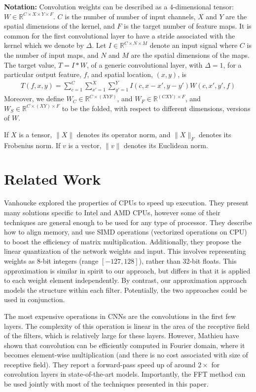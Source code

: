 \noindent \textbf{Notation:} Convolution weights can be described as
 a $4$-dimensional tensor: $W \in \mathbb{R}^{C \times X \times Y
   \times F}$. $C$ is the number of number of input channels, $X$ and
 $Y$ are the spatial dimensions of the kernel, and $F$ is the target
 number of feature maps. 
 It is common for the first convolutional layer to have a stride associated with the kernel which we denote by $\Delta$.  Let $I \in \mathbb{R}^{C \times N \times M}$
 denote an input signal where $C$ is the number of input maps, and $N$
 and $M$ are the spatial dimensions of the maps.  The target value, $T
 = I \ast W$, of a generic convolutional layer, with $\Delta = 1$, for a particular output
 feature, $f$, and spatial location, $(x, y)$, is
\begin{align*}
\label{convlayereq}
T(f,x,y) = \sum_{c=1}^C \sum_{x'=1}^{X} \sum_{y'=1}^{Y} I(c,x-x',y-y') W(c,x',y',f)
\end{align*}
Moreover, we define $W_C \in \mathbb{R}^{C \times (XYF)}$, and $W_F \in \mathbb{R}^{(CXY) \times F}$, 
and $W_S \in \mathbb{R}^{C \times (XY) \times F}$ to be the folded, with respect to different dimensions, versions of $W$.

If $X$ is a tensor, $\|X \|$ denotes its operator norm, and $\|X \|_F$ denotes its Frobenius norm.
If $v$ is a vector, $\|v \|$ denotes its Euclidean norm.

\section{Related Work}
\label{relwork}

Vanhoucke \etal \cite{vanhoucke2011improving} explored the
properties of CPUs to speed up execution.  They present many solutions
specific to Intel and AMD CPUs, however some of their techniques are
general enough to be used for any type of processor.  They describe
how to align memory, and use SIMD operations (vectorized operations on
CPU) to boost the efficiency of matrix multiplication.  Additionally, they
propose the linear quantization of the network weights and input. This
involves representing weights as 8-bit integers (range
$[-127, 128]$), rather than 32-bit floats. This approximation is
similar in spirit to our approach, but differs in that it is applied
to each weight element independently. By contrast, our approximation approach models
the structure within each filter. Potentially, the two approaches
could be used in conjunction. 

The most expensive operations in CNNs are the
convolutions in the first few layers. The complexity of this operation
is linear in the area of the receptive field of the filters, which is
relatively large for these layers.  However, Mathieu \etal \cite{mathieu2013fast} have shown that convolution can be
efficiently computed in Fourier domain, where it becomes element-wise
multiplication (and there is no cost associated with size of receptive
field). They report a forward-pass speed up of around $2\times$ for
convolution layers in state-of-the-art models. Importantly, the FFT method can
be used jointly with most of the techniques presented in this paper.


